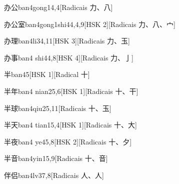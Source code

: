 \begin{entry}{办公}{ban4gong1}{4,4}[Radicais ⼒、⼋]
\end{entry}

\begin{entry}{办公室}{ban4gong1shi4}{4,4,9}[HSK 2][Radicais ⼒、⼋、⼧]
\end{entry}

\begin{entry}{办理}{ban4li3}{4,11}[HSK 3][Radicais ⼒、⽟]
\end{entry}

\begin{entry}{办事}{ban4 shi4}{4,8}[HSK 4][Radicais ⼒、⼅]
\end{entry}

\begin{entry}{半}{ban4}{5}[HSK 1][Radical ⼗]
\end{entry}

\begin{entry}{半年}{ban4 nian2}{5,6}[HSK 1][Radicais ⼗、⼲]
\end{entry}

\begin{entry}{半球}{ban4qiu2}{5,11}[Radicais ⼗、⽟]
\end{entry}

\begin{entry}{半天}{ban4 tian1}{5,4}[HSK 1][Radicais ⼗、⼤]
\end{entry}

\begin{entry}{半夜}{ban4 ye4}{5,8}[HSK 2][Radicais ⼗、⼣]
\end{entry}

\begin{entry}{半音}{ban4yin1}{5,9}[Radicais ⼗、⾳]
\end{entry}

\begin{entry}{伴侣}{ban4lv3}{7,8}[Radicais ⼈、⼈]
\end{entry}

